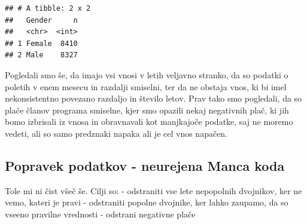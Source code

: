 \documentclass[
]{article}
\begin{document}
\begin{verbatim}
## # A tibble: 2 x 2
##   Gender     n
##   <chr>  <int>
## 1 Female  8410
## 2 Male    8327
\end{verbatim}

Pogledali smo še, da imajo vsi vnosi v letih veljavno stranko, da so
podatki o poletih v enem mesecu in razdalji smiselni, ter da ne obstaja
vnos, ki bi imel nekonsistentno povezano razdaljo in število letov. Prav
tako smo pogledali, da so plače članov programa smiselne, kjer smo
opazili nekaj negativnih plač, ki jih bomo izbrisali iz vnosa in
obravnavali kot manjkajoče podatke, saj ne moremo vedeti, ali so samo
predznaki napaka ali je cel vnos napačen.

\subsection{Popravek podatkov - neurejena Manca
koda}\label{popravek-podatkov---neurejena-manca-koda}

Tole mi ni čist všeč še. Cilji so: - odstraniti vse lete nepopolnih
dvojnikov, ker ne vemo, kateri je pravi - odstraniti popolne dvojnike,
ker lahko zaupamo, da so vseeno pravilne vrednosti - odstrani negativne
plače
\end{document}
